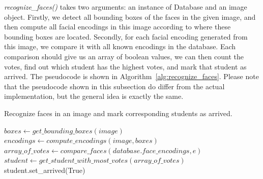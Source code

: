 \emph{recognize\_faces()} takes two arguments: an instance of Database and an image object.
Firstly, we detect all bounding boxes of the faces in the given image, and then
compute all facial encodings in this image according to where these bounding boxes are located.
Secondly, for each facial encoding generated from this image, we compare it with all known encodings in the database.
Each comparison should give us an array of boolean values, we can then count the votes,
find out which student has the highest votes, and mark that student as arrived.
The pseudocode is shown in Algorithm~\ref{alg:recognize_faces}.
Please note that the pseudocode shown in this subsection do differ from the actual implementation,
but the general idea is exactly the same.
\vspace{0.2cm}

\begin{algorithm}
  \caption{Recognize faces in an image and mark corresponding students as arrived.}
  \label{alg:recognize_faces}
  \begin{algorithmic}
      \State $boxes \leftarrow get\_bounding\_boxes(image)$
      \State $encodings \leftarrow compute\_encodings(image, boxes)$
      \State 
        \State $array\_of\_votes \leftarrow compare\_faces(database.face\_encodings, e)$
        \State  $student \leftarrow get\_student\_with\_most\_votes(array\_of\_votes)$
        \State student.set\_arrived(True)
      \EndFor
    \EndProcedure
  \end{algorithmic}
\end{algorithm}
\vspace{0.5cm}
